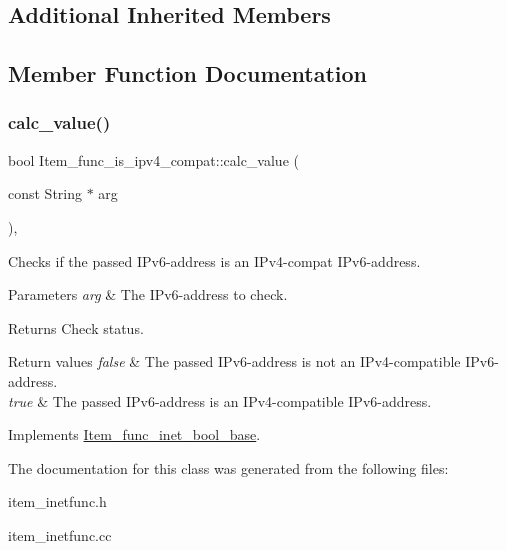 \subsection*{Additional Inherited Members}


\subsection{Member Function Documentation}
\mbox{\label{classItem__func__is__ipv4__compat_a5138af46bb5cff4334b4d746f0d680cf}} 
\subsubsection{\texorpdfstring{calc\+\_\+value()}{calc\_value()}}
{\footnotesize\ttfamily bool Item\+\_\+func\+\_\+is\+\_\+ipv4\+\_\+compat\+::calc\+\_\+value (\begin{DoxyParamCaption}\item[{const String $\ast$}]{arg }\end{DoxyParamCaption})\hspace{0.3cm}{\ttfamily [protected]}, {\ttfamily [virtual]}}

Checks if the passed I\+Pv6-\/address is an I\+Pv4-\/compat I\+Pv6-\/address.


\begin{DoxyParams}{Parameters}
{\em arg} & The I\+Pv6-\/address to check.\\
\hline
\end{DoxyParams}
\begin{DoxyReturn}{Returns}
Check status. 
\end{DoxyReturn}

\begin{DoxyRetVals}{Return values}
{\em false} & The passed I\+Pv6-\/address is not an I\+Pv4-\/compatible I\+Pv6-\/address. \\
\hline
{\em true} & The passed I\+Pv6-\/address is an I\+Pv4-\/compatible I\+Pv6-\/address. \\
\hline
\end{DoxyRetVals}


Implements \mbox{\hyperlink{classItem__func__inet__bool__base}{Item\+\_\+func\+\_\+inet\+\_\+bool\+\_\+base}}.



The documentation for this class was generated from the following files\+:\begin{DoxyCompactItemize}
\item 
item\+\_\+inetfunc.\+h\item 
item\+\_\+inetfunc.\+cc\end{DoxyCompactItemize}
